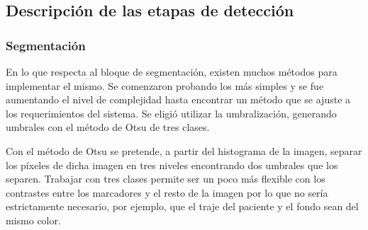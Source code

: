 \subsection{Descripción de las etapas de detección}
\subsubsection{Segmentación}
En lo que respecta al bloque de segmentación, existen muchos métodos para implementar el mismo. Se comenzaron probando los más simples y se fue aumentando el nivel de complejidad hasta encontrar un método que se ajuste a los requerimientos del sistema. Se eligió utilizar la umbralización, generando umbrales con el método de Otsu\cite{otsu} de tres clases.

Con el método de Otsu \cite{otsu} se pretende, a partir del histograma de la imagen, separar los píxeles de dicha imagen en tres niveles encontrando dos umbrales que los separen. Trabajar con tres clases permite ser un poco más flexible con los contrastes entre los marcadores y el resto de la imagen por lo que no sería estrictamente necesario, por ejemplo, que el traje del paciente y el fondo sean del mismo color.

